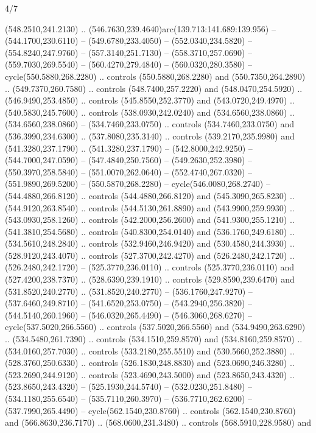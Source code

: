 \begin{flagdescription}{4/7}
\begin{scope}[shift={(0.5\flaglength,0.5\flagwidth)},scale=\flagwidth*\stretchfactor/820]
\begin{scope}[scale=1.87,xshift=-138mm,yshift=75mm]
\begin{scope}[y=0.8pt, x=0.8pt, yscale=-1, xscale=1]
\begin{scope}[fill=cd2a567]
  (548.2510,241.2130) .. (546.7630,239.4640)arc(139.713:141.689:139.956) --
  (544.1700,230.6110) -- (549.6780,233.4050) -- (552.0340,234.5820) --
  (554.8240,247.9760) -- (557.3140,251.7130) -- (558.3710,257.0690) --
  (559.7030,269.5540) -- (560.4270,279.4840) -- (560.0320,280.3580) --
  cycle(550.5880,268.2280) .. controls (550.5880,268.2280) and
  (550.7350,264.2890) .. (549.7370,260.7580) .. controls (548.7400,257.2220) and
  (548.0470,254.5920) .. (546.9490,253.4850) .. controls (545.8550,252.3770) and
  (543.0720,249.4970) .. (540.5830,245.7600) .. controls (538.0930,242.0240) and
  (534.6560,238.0860) .. (534.6560,238.0860) -- (534.7460,233.0750) .. controls
  (534.7460,233.0750) and (536.3990,234.6300) .. (537.8080,235.3140) .. controls
  (539.2170,235.9980) and (541.3280,237.1790) .. (541.3280,237.1790) --
  (542.8000,242.9250) -- (544.7000,247.0590) -- (547.4840,250.7560) --
  (549.2630,252.3980) -- (550.3970,258.5840) -- (551.0070,262.0640) --
  (552.4740,267.0320) -- (551.9890,269.5200) -- (550.5870,268.2280) --
  cycle(546.0080,268.2740) -- (544.4880,266.8120) .. controls
  (544.4880,266.8120) and (545.3090,265.8230) .. (544.9120,263.8540) .. controls
  (544.5130,261.8890) and (543.9900,259.9930) .. (543.0930,258.1260) .. controls
  (542.2000,256.2600) and (541.9300,255.1210) .. (541.3810,254.5680) .. controls
  (540.8300,254.0140) and (536.1760,249.6180) .. (534.5610,248.2840) .. controls
  (532.9460,246.9420) and (530.4580,244.3930) .. (528.9120,243.4070) .. controls
  (527.3700,242.4270) and (526.2480,242.1720) .. (526.2480,242.1720) --
  (525.3770,236.0110) .. controls (525.3770,236.0110) and (527.4200,238.7370) ..
  (528.6390,239.1910) .. controls (529.8590,239.6470) and (531.8520,240.2770) ..
  (531.8520,240.2770) -- (536.1760,247.9270) -- (537.6460,249.8710) --
  (541.6520,253.0750) -- (543.2940,256.3820) -- (544.5140,260.1960) --
  (546.0320,265.4490) -- (546.3060,268.6270) -- cycle(537.5020,266.5560) ..
  controls (537.5020,266.5560) and (534.9490,263.6290) .. (534.5480,261.7390) ..
  controls (534.1510,259.8570) and (534.8160,259.8570) .. (534.0160,257.7030) ..
  controls (533.2180,255.5510) and (530.5660,252.3880) .. (528.3760,250.6330) ..
  controls (526.1830,248.8830) and (523.0690,246.3280) .. (523.2690,244.9120) ..
  controls (523.4690,243.5000) and (523.8650,243.4320) .. (523.8650,243.4320) --
  (525.1930,244.5740) -- (532.0230,251.8480) -- (534.1180,255.6540) --
  (535.7110,260.3970) -- (536.7710,262.6200) -- (537.7990,265.4490) --
  cycle(562.1540,230.8760) .. controls (562.1540,230.8760) and
  (566.8630,236.7170) .. (568.0600,231.3480) .. controls (568.5910,228.9580) and

\end{scope}
\end{scope}
\end{scope}
\end{scope}
\end{flagdescription}
